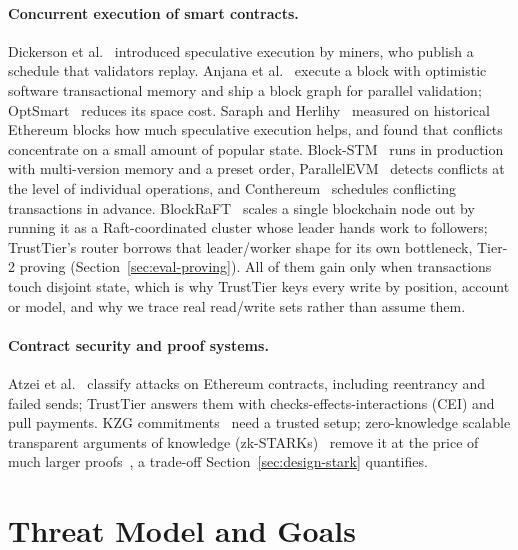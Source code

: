 \documentclass[sigconf,nonacm]{acmart}
\begin{document}
\paragraph{Concurrent execution of smart contracts.} Dickerson et al.~\cite{dickerson2017adding} introduced speculative execution by miners, who publish a schedule that validators replay. Anjana et al.~\cite{anjana2019efficient} execute a block with optimistic software transactional memory and ship a block graph for parallel validation; OptSmart~\cite{anjana2022optsmart} reduces its space cost. Saraph and Herlihy~\cite{saraph2020empirical} measured on historical Ethereum blocks how much speculative execution helps, and found that conflicts concentrate on a small amount of popular state. Block-STM~\cite{gelashvili2023blockstm} runs in production with multi-version memory and a preset order, ParallelEVM~\cite{lin2025parallelevm} detects conflicts at the level of individual operations, and Conthereum~\cite{chahoki2025conthereum} schedules conflicting transactions in advance. BlockRaFT~\cite{piduguralla2026blockraft} scales a single blockchain node out by running it as a Raft-coordinated cluster whose leader hands work to followers; TrustTier's router borrows that leader/worker shape for its own bottleneck, Tier-2 proving (Section~\ref{sec:eval-proving}). All of them gain only when transactions touch disjoint state, which is why TrustTier keys every write by position, account or model, and why we trace real read/write sets rather than assume them.

\paragraph{Contract security and proof systems.} Atzei et al.~\cite{atzei2017survey} classify attacks on Ethereum contracts, including reentrancy and failed sends; TrustTier answers them with checks-effects-interactions (CEI) and pull payments. KZG commitments~\cite{kate2010kzg} need a trusted setup; zero-knowledge scalable transparent arguments of knowledge (zk-STARKs)~\cite{bensasson2019stark} remove it at the price of much larger proofs~\cite{nainwal2025comparative}, a trade-off Section~\ref{sec:design-stark} quantifies.

\section{Threat Model and Goals}
\label{sec:threat}
\end{document}
